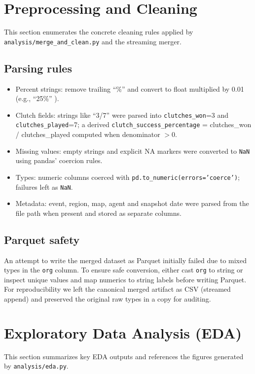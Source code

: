 \documentclass[11pt]{article}
\begin{document}
\section{Preprocessing and Cleaning}
This section enumerates the concrete cleaning rules applied by \texttt{analysis/merge\_and\_clean.py} and the streaming merger.

\subsection{Parsing rules}
\begin{itemize}[noitemsep]
  \item Percent strings: remove trailing ``\%'' and convert to float multiplied by 0.01 (e.g., ``25\%'' ).
  \item Clutch fields: strings like ``3/7'' were parsed into \texttt{clutches\_won}=3 and \texttt{clutches\_played}=7; a derived \texttt{clutch\_success\_percentage} = clutches\_won / clutches\_played computed when denominator $>0$. 
  \item Missing values: empty strings and explicit NA markers were converted to \texttt{NaN} using pandas' coercion rules.
  \item Types: numeric columns coerced with \texttt{pd.to\_numeric(errors='coerce')}; failures left as \texttt{NaN}.
  \item Metadata: event, region, map, agent and snapshot date were parsed from the file path when present and stored as separate columns.
\end{itemize}

\subsection{Parquet safety}
An attempt to write the merged dataset as Parquet initially failed due to mixed types in the \texttt{org} column. To ensure safe conversion, either cast \texttt{org} to string or inspect unique values and map numerics to string labels before writing Parquet. For reproducibility we left the canonical merged artifact as CSV (streamed append) and preserved the original raw types in a copy for auditing.

\section{Exploratory Data Analysis (EDA)}
This section summarizes key EDA outputs and references the figures generated by \texttt{analysis/eda.py}.
\end{document}
